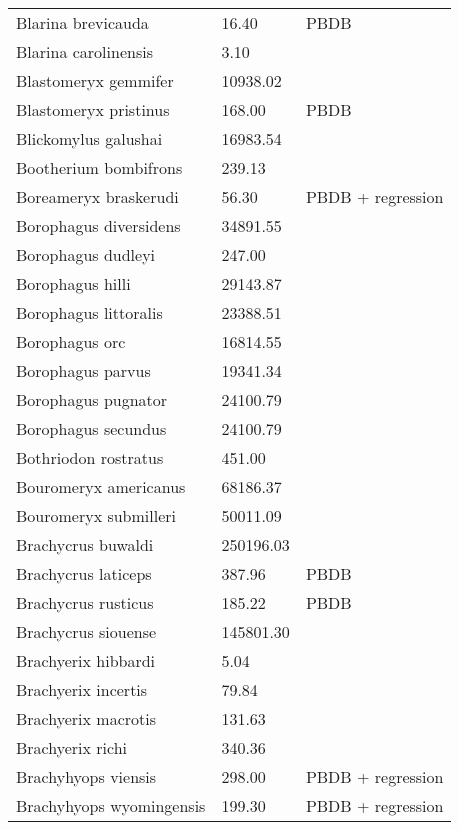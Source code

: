 \begin{longtable}{p{} p{} p{}}
    Blarina brevicauda & 16.40 & PBDB \\ 
    Blarina carolinensis & 3.10 & \cite{Smith2004} \\ 
    Blastomeryx gemmifer & 10938.02 & \cite{Tomiya2013} \\ 
    Blastomeryx pristinus & 168.00 & PBDB \\ 
    Blickomylus galushai & 16983.54 & \cite{Tomiya2013} \\ 
    Bootherium bombifrons & 239.13 & \cite{Smith2004} \\ 
    Boreameryx braskerudi & 56.30 & PBDB + regression \\ 
    Borophagus diversidens & 34891.55 & \cite{Tomiya2013} \\ 
    Borophagus dudleyi & 247.00 & \cite{Dalquest1978} \\ 
    Borophagus hilli & 29143.87 & \cite{Tomiya2013} \\ 
    Borophagus littoralis & 23388.51 & \cite{Tomiya2013} \\ 
    Borophagus orc & 16814.55 & \cite{Tomiya2013} \\ 
    Borophagus parvus & 19341.34 & \cite{Tomiya2013} \\ 
    Borophagus pugnator & 24100.79 & \cite{Tomiya2013} \\ 
    Borophagus secundus & 24100.79 & \cite{Tomiya2013} \\ 
    Bothriodon rostratus & 451.00 & \cite{Cassiliano2008} \\ 
    Bouromeryx americanus & 68186.37 & \cite{Tomiya2013} \\ 
    Bouromeryx submilleri & 50011.09 & \cite{Tomiya2013} \\ 
    Brachycrus buwaldi & 250196.03 & \cite{Tomiya2013} \\ 
    Brachycrus laticeps & 387.96 & PBDB \\ 
    Brachycrus rusticus & 185.22 & PBDB \\ 
    Brachycrus siouense & 145801.30 & \cite{Tomiya2013} \\ 
    Brachyerix hibbardi & 5.04 & \cite{Clemens2011} \\ 
    Brachyerix incertis & 79.84 & \cite{Tomiya2013} \\ 
    Brachyerix macrotis & 131.63 & \cite{Tomiya2013} \\ 
    Brachyerix richi & 340.36 & \cite{Tomiya2013} \\ 
    Brachyhyops viensis & 298.00 & PBDB + regression \\ 
    Brachyhyops wyomingensis & 199.30 & PBDB + regression \\ 

\end{longtable}
